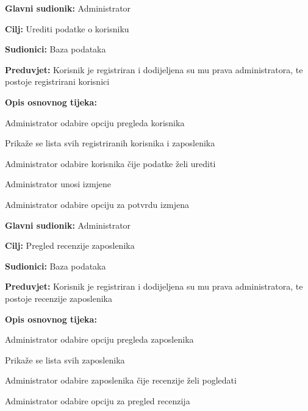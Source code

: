 \noindent {}
\begin{packed_item}
	
	\item \textbf{Glavni sudionik: } Administrator
	\item  \textbf{Cilj:} Urediti podatke o korisniku
	\item  \textbf{Sudionici:} Baza podataka
	\item  \textbf{Preduvjet:} Korisnik je registriran i dodijeljena su mu prava administratora, te postoje registrirani korisnici
	\item  \textbf{Opis osnovnog tijeka:}
	
	\item[] \begin{packed_enum}
		
		\item Administrator odabire opciju pregleda korisnika
		\item Prikaže se lista svih registriranih korisnika i zaposlenika
		\item Administrator odabire korisnika čije podatke želi urediti
		\item Administrator unosi izmjene
		\item Administrator odabire opciju za potvrdu izmjena
	\end{packed_enum}
\end{packed_item}

\noindent {}
\begin{packed_item}
	
	\item \textbf{Glavni sudionik: } Administrator
	\item  \textbf{Cilj:} Pregled recenzije zaposlenika
	\item  \textbf{Sudionici:} Baza podataka
	\item  \textbf{Preduvjet:} Korisnik je registriran i dodijeljena su mu prava administratora, te postoje recenzije zaposlenika
	\item  \textbf{Opis osnovnog tijeka:}
	
	\item[] \begin{packed_enum}
		
		\item Administrator odabire opciju pregleda zaposlenika
		\item Prikaže se lista svih zaposlenika
		\item Administrator odabire zaposlenika čije recenzije želi pogledati
		\item Administrator odabire opciju za pregled recenzija
	\end{packed_enum}
\end{packed_item}

